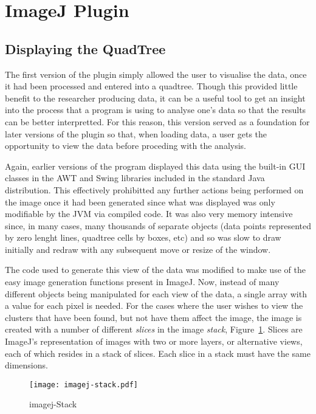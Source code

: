 
\section{ImageJ Plugin}
\label{sec:imagej_plugin}

\cite{imagejapi}

\subsection{Displaying the QuadTree}
\label{sub:displaying_the_quadtree}

The first version of the plugin simply allowed the user to visualise the data,
once it had been processed and entered into a quadtree. Though this provided
little benefit to the researcher producing data, it can be a useful tool to get
an insight into the process that a program is using to analyse one's data so
that the results can be better interpretted. For this reason, this version
served as a foundation for later versions of the plugin so that, when loading
data, a user gets the opportunity to view the data before proceding with the
analysis.

Again, earlier versions of the program displayed this data using the built-in
GUI classes in the AWT and Swing libraries included in the standard Java
distribution. This effectively prohibitted any further actions being performed
on the image once it had been generated since what was displayed was only
modifiable by the JVM via compiled code. It was also very memory intensive
since, in many cases, many thousands of separate objects (data points
represented by zero lenght lines, quadtree cells by boxes, etc) and so was slow
to draw initially and redraw with any subsequent move or resize of the window.

The code used to generate this view of the data was modified to make use of the
easy image generation functions present in ImageJ. Now, instead of many
different objects being manipulated for each view of the data, a single array
with a value for each pixel is needed. For the cases where the user wishes to
view the clusters that have been found, but not have them affect the image, the
image is created with a number of different \emph{slices} in the image
\emph{stack}, Figure~\ref{fig:imagej-stack}. Slices are ImageJ's representation
of images with two or more layers, or alternative views, each of which resides
in a stack of slices. Each slice in a stack must have the same dimensions.

\begin{figure}[tbhp]
	\centering
	\texttt{[image: imagej-stack.pdf]}
	\caption{imagej-Stack}
	\label{fig:imagej-stack}
\end{figure}
